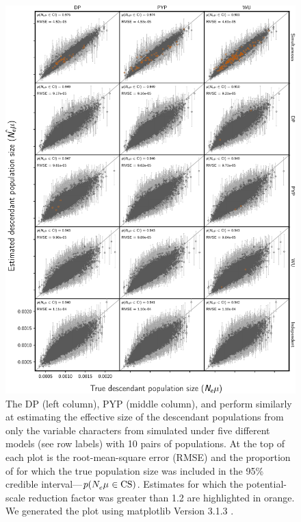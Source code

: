 \begin{figure}[htbp]
    \begin{center}
        \includegraphics[width=\textwidth,height=0.9\textheight,keepaspectratio]{../images/from-project-repo/var-only-infer-columns-by-data-rows-descendant-size-scatter-cropped.pdf}
        \captionsetup{name=Figure S, labelformat=noSpace, listformat=sFigList}
        \caption{\footnotesize
        The DP (left column),
        PYP (middle column),
        and
        \wunif
        perform similarly at estimating the effective size of the descendant
        populations from only the variable characters from \datasets simulated
        under five different models (see row labels) with 10 pairs of
        populations.
        At the top of each plot is the root-mean-square error (RMSE)
        and
        the proportion of \datasets for which the true population size was
        included in the 95\% credible interval---$p(N_{e}^{}\mu_{} \in
        \textrm{CS})$.
        Estimates for which the potential-scale reduction factor was greater
        than 1.2 \citep{Brooks1998} are highlighted in orange.
        We generated the plot using matplotlib Version 3.1.3
        \citep{matplotlib}.
        }
        \label{fig:varonlydescpopsizegrid}
    \end{center}
\end{figure}

